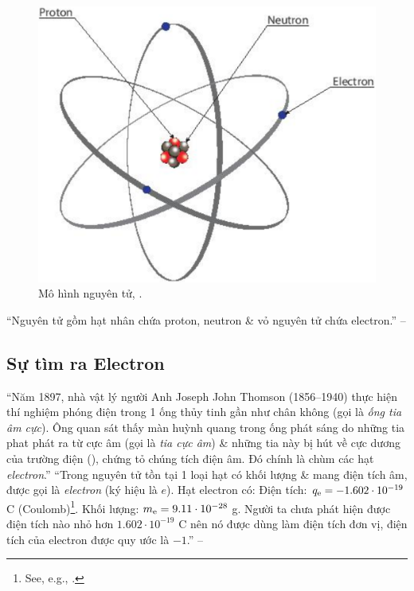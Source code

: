 \documentclass[oneside]{book}
\numberwithin{equation}{section}
\begin{document}
\begin{figure}[H]
	\centering
	\includegraphics[scale=0.15]{mo_hinh_nguyen_tu}
	\caption{Mô hình nguyên tử, \cite[Hình 2.1, p. 13]{SGK_Hoa_Hoc_10_Chan_Troi_Sang_Tao}.}
\end{figure}
``Nguyên tử gồm hạt nhân chứa proton, neutron \& vỏ nguyên tử chứa electron.'' -- \cite[p. 14]{SGK_Hoa_Hoc_10_Chan_Troi_Sang_Tao}

\subsection{Sự tìm ra Electron}
``Năm 1897, nhà vật lý người Anh Joseph John Thomson (1856--1940) thực hiện thí nghiệm phóng điện trong 1 ống thủy tinh gần như chân không (gọi là \textit{ống tia âm cực}). Ông quan sát thấy màn huỳnh quang trong ống phát sáng do những tia phat phát ra từ cực âm (gọi là \textit{tia cực âm}) \& những tia này bị hút về cực dương của trường điện  (\cite[Hình 2.2: \textsf{Thí nghiệm của Thomson}, p. 13]{SGK_Hoa_Hoc_10_Chan_Troi_Sang_Tao}), chứng tỏ chúng tích điện âm. Đó chính là chùm các hạt \textit{electron}.'' ``Trong nguyên tử tồn tại 1 loại hạt có khối lượng \& mang điện tích âm, được gọi là \textit{electron} (ký hiệu là $e$). Hạt electron có: Điện tích: $q_{\rm e} = -1.602\cdot 10^{-19}$ C (Coulomb)\footnote{See, e.g., \cite{SGK_Vat_Ly_11_co_ban, SGK_Vat_Ly_11_nang_cao}.}. Khối lượng: $m_{\rm e} = 9.11\cdot 10^{-28}$ g. Người ta chưa phát hiện được điện tích nào nhỏ hơn $1.602\cdot 10^{-19}$ C nên nó được dùng làm điện tích đơn vị, điện tích của electron được quy ước là $-1$.'' -- \cite[p. 14]{SGK_Hoa_Hoc_10_Chan_Troi_Sang_Tao}
\end{document}
